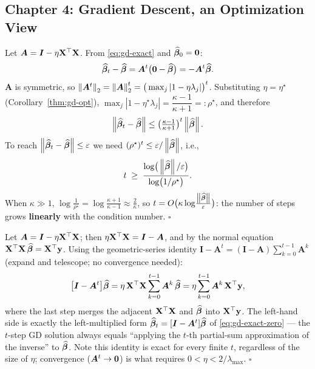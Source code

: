 \subsection{Chapter 4: Gradient Descent, an Optimization View}

\begin{description}[style=nextline, itemsep=1.2ex]
\item[Exercise \ref{ex:gd-rate} (convergence bound under the optimal step size)]
Let $\bm{A} = \bm{I} - \eta\mathbf{X}^\top\mathbf{X}$. From \eqref{eq:gd-exact} and $\widehat{\bm{\beta}}_0 = \mathbf{0}$:
\[
  \widehat{\bm{\beta}}_t - \widehat{\bm{\beta}} = \bm{A}^t\big(\mathbf{0} - \widehat{\bm{\beta}}\big) = -\bm{A}^t \widehat{\bm{\beta}} .
\]
$\bm{A}$ is symmetric, so $\left\lVert \bm{A}^t \right\rVert_2 = \left\lVert \bm{A} \right\rVert_2^t = \big(\max_j |1 - \eta\lambda_j|\big)^t$. Substituting $\eta = \eta^\star$ (Corollary~\ref{thm:gd-opt}), $\max_j|1 - \eta^\star\lambda_j| = \dfrac{\kappa - 1}{\kappa + 1} =: \rho^\star$, and therefore
\[
  \left\lVert \widehat{\bm{\beta}}_t - \widehat{\bm{\beta}} \right\rVert \le \big(\tfrac{\kappa-1}{\kappa+1}\big)^t \left\lVert \widehat{\bm{\beta}} \right\rVert.
\]
To reach $\left\lVert \widehat{\bm{\beta}}_t - \widehat{\bm{\beta}} \right\rVert \le \varepsilon$ we need $(\rho^\star)^t \le \varepsilon / \left\lVert \widehat{\bm{\beta}} \right\rVert$, i.e.,
\[
  t \;\ge\; \frac{\log\!\big(\left\lVert \widehat{\bm{\beta}} \right\rVert/\varepsilon\big)}{\log\!\big(1/\rho^\star\big)} .
\]
When $\kappa \gg 1$, $\log\frac{1}{\rho^\star} = \log\frac{\kappa+1}{\kappa-1} \approx \frac{2}{\kappa}$, so $t = O\big(\kappa \log\!\frac{\left\lVert \widehat{\bm{\beta}} \right\rVert}{\varepsilon}\big)$: the number of steps grows \textbf{linearly} with the condition number. $\square$

\item[Exercise \ref{ex:neumann} (the Neumann identity)]
Let $\bm{A} = \bm{I} - \eta\mathbf{X}^\top\mathbf{X}$; then $\eta\mathbf{X}^\top\mathbf{X} = \bm{I} - \bm{A}$, and by the normal equation $\mathbf{X}^\top\mathbf{X}\,\widehat{\bm{\beta}} = \mathbf{X}^\top\mathbf{y}$. Using the geometric-series identity $\bm{I} - \bm{A}^t = (\bm{I}-\bm{A})\sum_{k=0}^{t-1}\bm{A}^k$ (expand and telescope; no convergence needed):
\[
  \big[\bm{I} - \bm{A}^t\big]\widehat{\bm{\beta}}
  = \eta\,\mathbf{X}^\top\mathbf{X} \sum_{k=0}^{t-1}\bm{A}^k\,\widehat{\bm{\beta}}
  = \eta \sum_{k=0}^{t-1}\bm{A}^k\,\mathbf{X}^\top\mathbf{y} ,
\]
where the last step merges the adjacent $\mathbf{X}^\top\mathbf{X}$ and $\widehat{\bm{\beta}}$ into $\mathbf{X}^\top\mathbf{y}$. The left-hand side is exactly the left-multiplied form $\widehat{\bm{\beta}}_t = [\bm{I} - \bm{A}^t]\widehat{\bm{\beta}}$ of \eqref{eq:gd-exact-zero} --- the $t$-step GD solution always equals ``applying the $t$-th partial-sum approximation of the inverse'' to $\widehat{\bm{\beta}}$. Note this identity is exact for every finite $t$, regardless of the size of $\eta$; convergence ($\bm{A}^t \to \mathbf{0}$) is what requires $0 < \eta < 2/\lambda_{\max}$. $\square$
\end{description}

